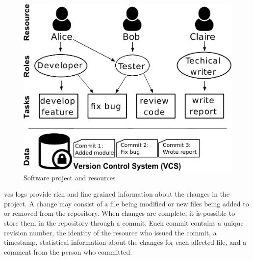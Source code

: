 \begin{figure}
   \centering

   \includegraphics[width=.8\columnwidth]{ResourceClassification/figures/vcs3-crop.pdf}      
   \caption{Software project and resources}
   \label{fig:big-picture}
\end{figure}

\Gls*{vcs} logs provide rich and fine grained information about the changes in the project. 
A change may consist of a file being modified or new files being added to or removed from the repository. When changes are complete, it is possible to store them in the repository through a commit. Each commit contains a unique revision number, the identity of the resource who issued the commit, a timestamp, statistical information about the changes for each affected file, and a comment from the person who committed.


